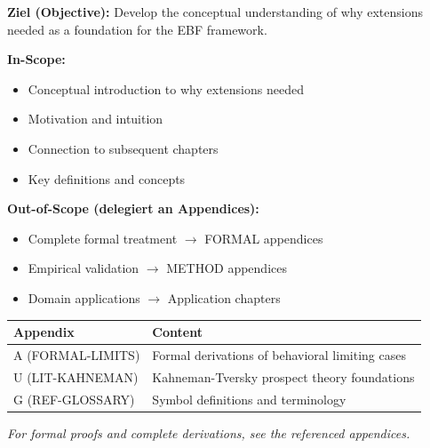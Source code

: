 \begin{tcolorbox}[
    colback=purple!5!white,
    colframe=purple!75!black,
    title={\textbf{Chapter Scope: Ziel / In-Scope / Out-of-Scope}},
    fonttitle=\bfseries
]

\textbf{Ziel (Objective):}
Develop the conceptual understanding of why extensions needed as a foundation for the EBF framework.

\vspace{0.3cm}
\textbf{In-Scope:}
\begin{itemize}[nosep]
    \item Conceptual introduction to why extensions needed
    \item Motivation and intuition
    \item Connection to subsequent chapters
    \item Key definitions and concepts
\end{itemize}

\vspace{0.3cm}
\textbf{Out-of-Scope (delegiert an Appendices):}
\begin{itemize}[nosep]
    \item Complete formal treatment $\rightarrow$ FORMAL appendices
    \item Empirical validation $\rightarrow$ METHOD appendices
    \item Domain applications $\rightarrow$ Application chapters
\end{itemize}

\end{tcolorbox}

\begin{tcolorbox}[
    colback=yellow!10!white,
    colframe=orange!75!black,
    title={\textbf{Appendix References for This Chapter}},
    fonttitle=\bfseries
]
\small
\begin{tabular}{@{}lp{8cm}@{}}
\textbf{Appendix} & \textbf{Content} \\
\midrule
A (FORMAL-LIMITS) & Formal derivations of behavioral limiting cases \\
U (LIT-KAHNEMAN) & Kahneman-Tversky prospect theory foundations \\
G (REF-GLOSSARY) & Symbol definitions and terminology \\
\end{tabular}

\medskip
\textit{For formal proofs and complete derivations, see the referenced appendices.}
\end{tcolorbox}

